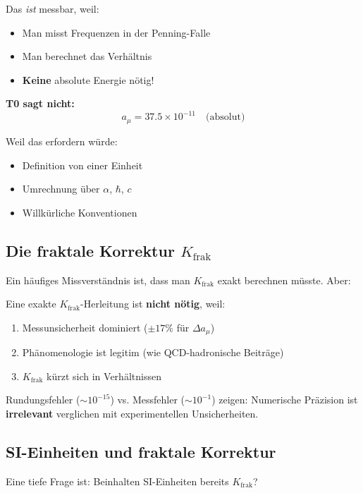Das \textit{ist} messbar, weil:
\begin{itemize}[nosep]
	\item Man misst Frequenzen in der Penning-Falle
	\item Man berechnet das Verhältnis
	\item \textbf{Keine} absolute Energie nötig!
\end{itemize}

\textbf{T0 sagt nicht:}
\begin{equation}
	a_\mu = 37.5 \times 10^{-11} \quad \text{(absolut)}
\end{equation}

Weil das erfordern würde:
\begin{itemize}[nosep]
	\item Definition von einer Einheit
	\item Umrechnung über $\alpha$, $\hbar$, $c$
	\item Willkürliche Konventionen
\end{itemize}

\subsection{Die fraktale Korrektur $K_\text{frak}$}

Ein häufiges Missverständnis ist, dass man $K_\text{frak}$ exakt berechnen müsste. Aber:

\begin{important}
	Eine exakte $K_\text{frak}$-Herleitung ist \textbf{nicht nötig}, weil:
	\begin{enumerate}
		\item Messunsicherheit dominiert ($\pm 17\%$ für $\Delta a_\mu$)
		\item Phänomenologie ist legitim (wie QCD-hadronische Beiträge)
		\item $K_\text{frak}$ kürzt sich in Verhältnissen
	\end{enumerate}
\end{important}

Rundungsfehler ($\sim 10^{-15}$) vs. Messfehler ($\sim 10^{-1}$) zeigen: Numerische Präzision ist \textbf{irrelevant} verglichen mit experimentellen Unsicherheiten.

\subsection{SI-Einheiten und fraktale Korrektur}

Eine tiefe Frage ist: Beinhalten SI-Einheiten bereits $K_\text{frak}$?

